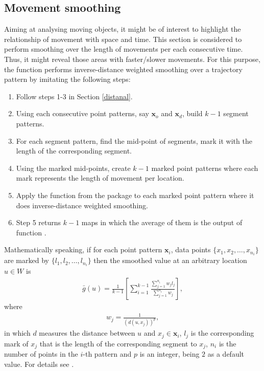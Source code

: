 \documentclass[article]{jss}
\begin{document}
  \subsection{Movement smoothing}
  Aiming at analysing moving objects, it might be of interest to highlight the relationship of movement with  space and time. This section is considered to perform smoothing over the length of movements per each consecutive time. Thus, it might reveal those areas with faster/slower movements. For this purpose, the function  performs inverse-distance weighted smoothing over a trajectory pattern by imitating the following steps:
  \begin{leftbar}
  \begin{enumerate}
  \item Follow steps 1-3 in Section \ref{distanal}.
  \item Using each consecutive point patterns, say $\mathbf{x}_o$ and $\mathbf{x}_d$, build $k-1$ segment patterns.
  \item For each segment pattern, find the mid-point of segments, mark it with the length of the corresponding segment.
  \item Using the marked mid-points, create $k-1$ marked point patterns where each mark represents the length of movement per location.
  \item Apply the function  from the package  \citep{BRT15} to each marked point pattern where it does inverse-distance weighted smoothing. 
  \item Step 5 returns $k-1$ maps in which the average of them is the output of function .
  \end{enumerate}
  \end{leftbar}
  Mathematically speaking, if for each point pattern $\mathbf{x}_i$, data points $\{ x_1,x_2,\ldots,x_{n_i} \}$ are marked by $\{ l_1,l_2,\ldots,l_{n_i} \}$ then the smoothed value at an arbitrary location $u\in W$ is
  \begin{eqnarray}
  \bar{g}(u)=\frac{1}{k-1} \left[ \sum\limits_{i=1}^{k-1} \frac{\sum\limits_{j=1}^{n_i}w_j l_j}{\sum\limits_{j=1}^{n_i} w_j} \right],
  \end{eqnarray}
  where 
  \begin{eqnarray}
  w_j=\frac{1}{(d(u,x_j))^p},
  \end{eqnarray}
  in which $d$ measures the distance between $u$ and $x_j \in \mathbf{x}_i$, $l_j$ is the corresponding mark of $x_j$ that is the length of the corresponding segment to $x_j$, $n_i$ is the number of points in the $i$-th pattern and $p$ is an integer, being $2$ as a default value. For details see \citet[Chapter 15]{BRT15}.
  
\end{document}
